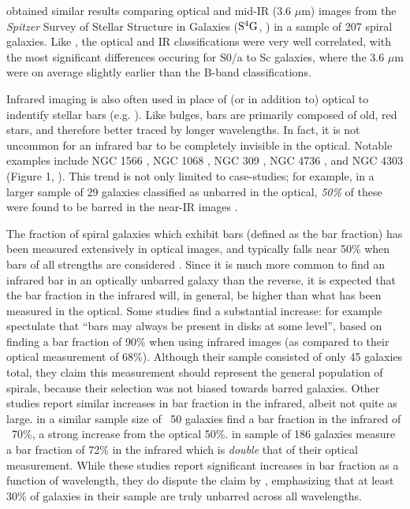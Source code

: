 \citet{Buta2010} obtained similar results comparing optical and mid-IR (3.6 $\mu$m) images from the \textit{Spitzer} Survey of Stellar Structure in Galaxies ($\rm S^4G$, \citet{Sheth2010}) in a sample of 207 spiral galaxies. Like \citet{Eskridge2002}, the optical and IR classifications were very well correlated, with the most significant differences occuring for S0/a to Sc galaxies, where the 3.6 $\mu$m were on average slightly earlier than the B-band classifications.

Infrared imaging is also often used in place of (or in addition to) optical to indentify stellar bars (e.g. \citet{Mulchaey1997,Knapen2000,Block2004,Sheth2008}). Like bulges, bars are primarily composed of old, red stars, and therefore better traced by longer wavelengths. In fact, it is not uncommon for an infrared bar to be completely invisible in the optical. Notable examples include NGC 1566 \citep{Hackwell1983}, NGC 1068 \citep{Thronson1989,Scoville1988}, NGC 309 \citep{Block1991}, NGC 4736 \citep{Block1994}, and NGC 4303 (Figure 1, \citet{Sheth2003}). This trend is not only limited to case-studies; for example, in a larger sample of 29 galaxies classified as unbarred in the optical, \emph{50\%} of these were found to be barred in the near-IR images \citep{Mulchaey1997}.

The fraction of spiral galaxies which exhibit bars (defined as the bar fraction) has been measured extensively in optical images, and typically falls near 50\% when bars of all strengths are considered \citep{Sheth2008,Masters2010,Galloway2015,Consolandi2017}. Since it is much more common to find an infrared bar in an optically unbarred galaxy than the reverse, it is expected that the bar fraction in the infrared will, in general, be higher than what has been measured in the optical. Some studies find a substantial increase: \citet{Seigar1998} for example spectulate that ``bars may always be present in disks at some level'', based on finding a bar fraction of 90\% when using infrared images (as compared to their optical measurement of 68\%). Although their sample consisted of only 45 galaxies total, they claim this measurement should represent the general population of spirals, because their selection was not biased towards barred galaxies. Other studies report similar increases in bar fraction in the infrared, albeit not quite as large. \citet{Knapen2000} in a similar sample size of ~50 galaxies find a bar fraction in the infrared of ~70\%, a strong increase from the optical 50\%. \citet{Eskridge2000} in sample of 186 galaxies measure a bar fraction of 72\% in the infrared which is \emph{double} that of their optical measurement. While these studies report significant increases in bar fraction as a function of wavelength, they do dispute the claim by \citet{Seigar1998}, emphasizing that at least 30\% of galaxies in their sample are truly unbarred across all wavelengths.

